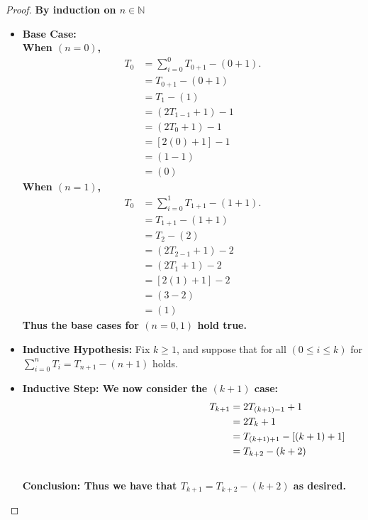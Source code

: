 \documentclass[11pt]{article}
\theoremstyle{definition}
\theoremstyle{definition}
\theoremstyle{definition}
\begin{document}

\begin{proof}\textbf{By induction on $n \in \mathbb{N}$}
\begin{itemize}
\item \textbf{Base Case:}
\\ \hspace*{20mm} \textbf{When $(n = 0)$,}
\begin{align*}
T_0 &= \sum_{i=0}^{0} T_{0+1} - (0 + 1). \\
&= T_{0+1} - (0 + 1) \\
&= T_1 - (1) \\
&= (2T_{1-1} +1) - 1 \\
&= (2T_{0} +1) - 1 \\
&= [2(0) +1] - 1 \\
&= (1 - 1) \\
&= (0)
\end{align*}
\hspace*{20mm} \textbf{When $(n = 1)$,}
\begin{align*}
T_0 &= \sum_{i=0}^{1} T_{1+1} - (1 + 1). \\
&= T_{1+1} - (1 + 1) \\
&= T_2 - (2) \\
&= (2T_{2-1} +1) - 2 \\
&= (2T_{1} +1) - 2 \\
&= [2(1) +1] - 2 \\
&= (3 - 2) \\
&= (1)
\end{align*}
\textbf{Thus the base cases for $(n=0,1)$ hold true.}
\item \textbf{Inductive Hypothesis:} Fix $k \geq 1$, and suppose that for all $(0 \leq i \leq k)$ for $\sum_{i=0}^{n} T_{i} = T_{n+1} - (n+1) $ holds.
\item \textbf{Inductive Step: We now consider the $(k+1)$ case:}
\begin{align*}
\hspace*{60mm} T_{k+1} &= 2T_{(k + 1) - 1} + 1 \\
\hspace*{60mm} &= 2T_{k} + 1 \\
\hspace*{60mm} &= T_{(k+1)+1} - [(k+1) + 1] \\
\hspace*{60mm} &= T_{k+2} - (k+2)
\end{align*}
\\ \textbf{Conclusion: Thus we have that $T_{k+1} = T_{k+2} - (k+2)$ as desired.}
\end{itemize}
\end{proof}



\end{document}
